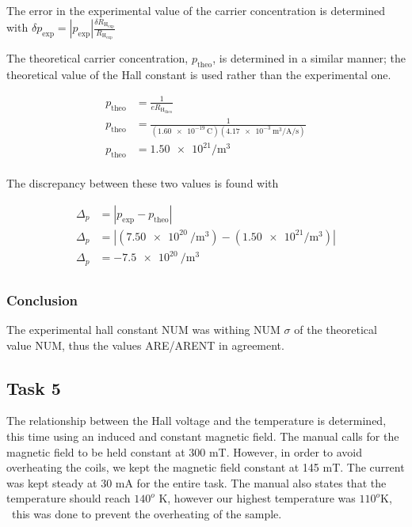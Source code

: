 \documentclass[a4paper]{article}
\begin{document}
The error in the experimental value of the carrier concentration is determined
with \( \delta p_{\text{exp}} = | p_{\text{exp}} | \frac{\delta
  R_{\text{H}_{\text{exp}}}}{R_{\text{H}_{\text{exp}}}} \)

\qq The theoretical carrier concentration, \( p_{\text{theo}} \), is determined in a
similar manner; the theoretical value of the Hall constant is used rather than
the experimental one.

\begin{align*}
  p_{\text{theo}} &= \frac{1}{\si{\elementarycharge} R_{\text{H}_{\text{theo}}}}
  \\
  p_{\text{theo}} &= \frac{1}{(\SI{1.60e-19}{\coulomb})
                    (\SI{4.17e-3}{\cubic\meter\per\ampere\per\second})} \\
  p_{\text{theo}} &= \num{1.50e21} \si{\per\cubic\meter} \\
\end{align*}

The discrepancy between these two values is found with

\begin{align*}
  \Delta_p &= | p_{\text{exp}} - p_{\text{theo}} | \\
  \Delta_p &= | (\SI{7.50e20}{\per\cubic\meter}) - (\num{1.50e21}
             \si{\per\cubic\meter}) | \\
  \Delta_p &= \SI{-7.5e20}{\per\cubic\meter} \\
\end{align*}



\subsubsection{Conclusion}
\qq The experimental hall constant NUM was withing NUM $\sigma$ of the
theoretical value NUM, thus the values ARE/ARENT in agreement.

\subsection{Task 5}

\qq The relationship between the Hall voltage and the temperature is
determined, this time using an induced and constant magnetic
field. The manual calls for the magnetic field to be held constant at
300 mT. However, in order to avoid overheating the coils, we kept the
magnetic field constant at 145 mT. The current was kept steady at 30
mA for the entire task. The manual also states that the temperature
should reach $140^o$ K, however our highest temperature was $110^o$K, \
this was done to prevent the overheating of the sample.
\end{document}
